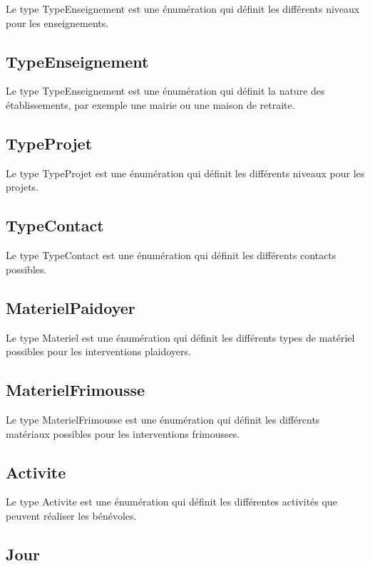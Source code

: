 \documentclass[asi, sansVersion]{picInsa}
\begin{document}
Le type TypeEnseignement est une énumération qui définit les différents niveaux pour les enseignements.

\subsection*{TypeEnseignement}

Le type TypeEnseignement est une énumération qui définit la nature des établissements, par exemple une mairie ou une maison de retraite.

\subsection*{TypeProjet}

Le type TypeProjet est une énumération qui définit les différents niveaux pour les projets.

\subsection*{TypeContact}

Le type TypeContact est une énumération qui définit les différents contacts possibles.

\subsection*{MaterielPaidoyer}

Le type Materiel est une énumération qui définit les différents types de matériel possibles pour les interventions plaidoyers.

\subsection*{MaterielFrimousse}

Le type MaterielFrimousse est une énumération qui définit les différents matériaux possibles pour les interventions frimousses.

\subsection*{Activite}

Le type Activite est une énumération qui définit les différentes activités que peuvent réaliser les bénévoles.

\subsection*{Jour}
\end{document}
